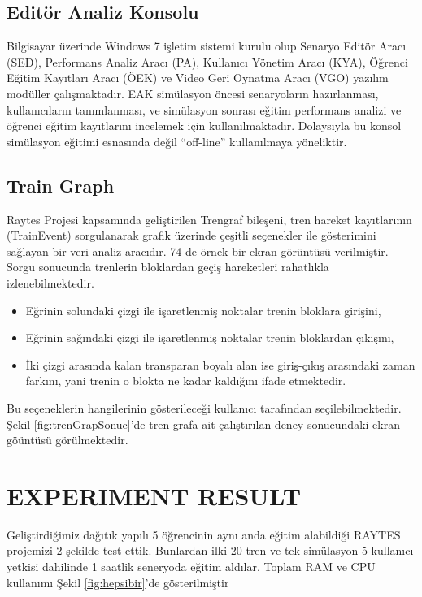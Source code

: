 \documentclass[conference]{IEEEtran}
\begin{document}
\subsection{Editör Analiz Konsolu}

Bilgisayar üzerinde Windows 7 işletim sistemi kurulu olup Senaryo Editör Aracı (SED), Performans Analiz Aracı (PA), Kullanıcı Yönetim Aracı (KYA), Öğrenci Eğitim Kayıtları Aracı (ÖEK) ve Video Geri Oynatma Aracı (VGO) yazılım modüller çalışmaktadır.
EAK simülasyon öncesi senaryoların hazırlanması, kullanıcıların tanımlanması, ve simülasyon sonrası eğitim performans analizi ve öğrenci eğitim kayıtlarını incelemek için kullanılmaktadır. Dolaysıyla bu konsol simülasyon eğitimi esnasında değil “off-line” kullanılmaya yöneliktir.

\subsection{Train Graph}


Raytes Projesi kapsamında geliştirilen Trengraf bileşeni, tren hareket kayıtlarının (TrainEvent) sorgulanarak grafik üzerinde çeşitli seçenekler ile gösterimini sağlayan bir veri analiz aracıdır.
74 de örnek bir ekran görüntüsü verilmiştir. Sorgu sonucunda trenlerin bloklardan geçiş hareketleri rahatlıkla izlenebilmektedir. 


\begin{itemize}
\item Eğrinin solundaki çizgi ile işaretlenmiş noktalar trenin bloklara girişini,
\item Eğrinin sağındaki çizgi ile işaretlenmiş noktalar trenin bloklardan çıkışını,
\item İki çizgi arasında kalan transparan boyalı alan ise giriş-çıkış arasındaki zaman farkını, yani trenin o blokta ne kadar kaldığını ifade etmektedir.
\end{itemize}

Bu seçeneklerin hangilerinin gösterileceği kullanıcı tarafından seçilebilmektedir.
Şekil \ref{fig:trenGrapSonuc}'de tren grafa ait çalıştırılan deney sonucundaki ekran göüntüsü görülmektedir.


\section{EXPERIMENT RESULT}
Geliştirdiğimiz dağıtık yapılı 5 öğrencinin aynı anda eğitim alabildiği RAYTES projemizi 2 şekilde test ettik. Bunlardan ilki 20 tren ve tek simülasyon 5 kullanıcı yetkisi dahilinde 1 saatlik seneryoda eğitim aldılar. Toplam RAM ve CPU kullanımı Şekil \ref{fig:hepsibir}'de gösterilmiştir
\end{document}
